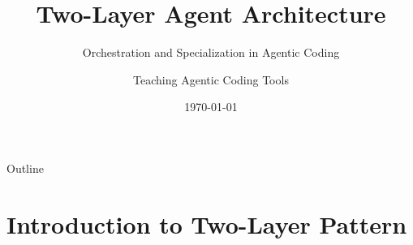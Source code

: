 \documentclass[aspectratio=169,11pt]{beamer}
\title[Two-Layer Agent Architecture]{Two-Layer Agent Architecture}
\subtitle{Orchestration and Specialization in Agentic Coding}
\author{Teaching Agentic Coding Tools}
\institute{University of South Carolina}
\date{\today}
\begin{document}
\begin{frame}[plain]
\titlepage
\end{frame}

\begin{frame}{Outline}
\tableofcontents
\end{frame}

\section{Introduction to Two-Layer Pattern}
\end{document}
